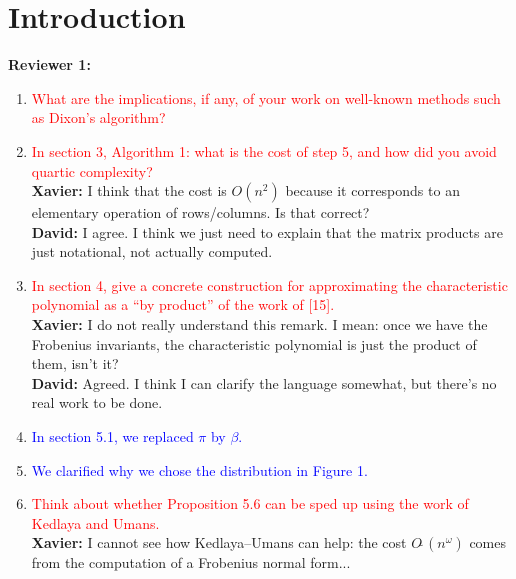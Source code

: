 \documentclass{sig-alternate-05-2015}
\newcommand{\softO}{O\tilde{~}}
\newcommand{\done}[1]{\textcolor{blue}{#1}}
\newcommand{\tdo}[1]{\textcolor{red}{#1}}
\newcommand{\xavier}[1]{\textcolor{answer}{{\bf Xavier:} #1}}
\newcommand{\david}[1]{\textcolor{answer}{{\bf David:} #1}}
\begin{document}
%
%

\section{Introduction}
\vspace{0.1in}
\noindent \textbf{Reviewer 1:}
\begin{enumerate}
\item \tdo{What are the implications, if any, of your work on well-known methods such as Dixon's algorithm?}
\item \tdo{In section 3, Algorithm 1: what is the cost of step 5, and how did you avoid quartic complexity?}\\
      \xavier{I think that the cost is $O(n^2)$ because it corresponds to an elementary operation of rows/columns. Is that correct?} \\
      \david{I agree.  I think we just need to explain that the matrix products are just notational, not actually computed.}
\item \tdo{In section 4, give a concrete construction for approximating the characteristic polynomial as a ``by product'' of the work of [15].}\\
      \xavier{I do not really understand this remark. I mean: once we have the Frobenius invariants, the characteristic polynomial is just the product of them, isn't it?}\\
      \david{Agreed.  I think I can clarify the language somewhat, but there's no real work to be done.}
\item \done{In section 5.1, we replaced $\pi$ by $\beta$.}
\item \done{We clarified why we chose the distribution in Figure 1.}
\item \tdo{Think about whether Proposition 5.6 can be sped up using the work of Kedlaya and Umans.}\\
      \xavier{I cannot see how Kedlaya--Umans can help: the cost $\softO(n^\omega)$ comes from the computation of a Frobenius normal form...}
\end{enumerate}
\end{document}
